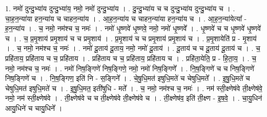 \documentclass[17pt]{extarticle}
\begin{document}
1. नमो॑ दुन्दु॒भ्या॑य दुन्दु॒भ्या॑य॒ नमो॒ नमो॑ दुन्दु॒भ्या॑य । . दु॒न्दु॒भ्या॑य च च दुन्दु॒भ्या॑य दुन्दु॒भ्या॑य च । . चा॒ह॒न॒न्या॑या हन॒न्या॑य च चाहन॒न्या॑य । . आ॒ह॒न॒न्या॑य च चाहन॒न्या॑या हन॒न्या॑य च । . आ॒ह॒न॒न्या॑येत्या᳚ - ह॒न॒न्या॑य । . च॒ नमो॒ नम॑श्च च॒ नमः॑ । . नमो॑ धृ॒ष्णवे॑ धृ॒ष्णवे॒ नमो॒ नमो॑ धृ॒ष्णवे᳚ । . धृ॒ष्णवे॑ च च धृ॒ष्णवे॑ धृ॒ष्णवे॑ च । . च॒ प्र॒मृ॒शाय॑ प्रमृ॒शाय॑ च च प्रमृ॒शाय॑ । . प्र॒मृ॒शाय॑ च च प्रमृ॒शाय॑ प्रमृ॒शाय॑ च । . प्र॒मृ॒शायेति॑ प्र - मृ॒शाय॑ । . च॒ नमो॒ नम॑श्च च॒ नमः॑ । . नमो॑ दू॒ताय॑ दू॒ताय॒ नमो॒ नमो॑ दू॒ताय॑ । . दू॒ताय॑ च च दू॒ताय॑ दू॒ताय॑ च । . च॒ प्रहि॑ताय॒ प्रहि॑ताय च च॒ प्रहि॑ताय । . प्रहि॑ताय च च॒ प्रहि॑ताय॒ प्रहि॑ताय च । . प्रहि॑ता॒येति॒ प्र - हि॒ता॒य॒ । . च॒ नमो॒ नम॑श्च च॒ नमः॑ । . नमो॑ निष॒ङ्गिणे॑ निष॒ङ्गिणे॒ नमो॒ नमो॑ निष॒ङ्गिणे᳚ । . नि॒ष॒ङ्गिणे॑ च च निष॒ङ्गिणे॑ निष॒ङ्गिणे॑ च । . नि॒ष॒ङ्गिण॒ इति॑ नि - स॒ङ्गिने᳚ । . चे॒षु॒धि॒मत॑ इषुधि॒मते॑ च चेषुधि॒मते᳚ । . इ॒षु॒धि॒मते॑ च चेषुधि॒मत॑ इषुधि॒मते॑ च । . इ॒षु॒धि॒मत॒ इती॑षुधि - मते᳚ । . च॒ नमो॒ नम॑श्च च॒ नमः॑ । . नम॑ स्ती॒क्ष्णेष॑वे ती॒क्ष्णेष॑वे॒ नमो॒ नम॑ स्ती॒क्ष्णेष॑वे । . ती॒क्ष्णेष॑वे च च ती॒क्ष्णेष॑वे ती॒क्ष्णेष॑वे च । . ती॒क्ष्णेष॑व॒ इति॑ ती॒क्ष्ण - इ॒ष॒वे॒ । . चा॒यु॒धिन॑ आयु॒धिने॑ च चायु॒धिने᳚ । \newline
\end{document}
